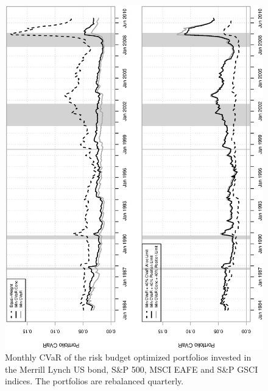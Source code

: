 \documentclass[11pt]{article}
\begin{document}
\begin{figure}[tb]
\begin{center}
\caption{Monthly CVaR of the risk budget optimized portfolios invested in the Merrill Lynch US bond, S\&P 500, MSCI EAFE and S\&P GSCI indices. The portfolios are rebalanced quarterly.  }
\includegraphics[width=12cm,angle=270]{portfolioCVaR.eps}
\end{center}
\end{figure}

\newpage
\end{document}
